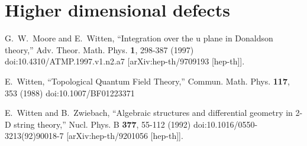 \documentclass[11pt]{amsart}
\def\ep{\varepsilon}
\def\brian#1{{\textcolor{blue!65!red}{BRW: {#1}}}}
\begin{document}
\section{Higher dimensional defects} 


\begin{thebibliography}{KWWY14}

G.~W.~Moore and E.~Witten,
``Integration over the u plane in Donaldson theory,''
Adv. Theor. Math. Phys. \textbf{1}, 298-387 (1997)
doi:10.4310/ATMP.1997.v1.n2.a7
[arXiv:hep-th/9709193 [hep-th]].

E.~Witten,
``Topological Quantum Field Theory,''
Commun. Math. Phys. \textbf{117}, 353 (1988)
doi:10.1007/BF01223371


E.~Witten and B.~Zwiebach,
``Algebraic structures and differential geometry in 2-D string theory,''
Nucl. Phys. B \textbf{377}, 55-112 (1992)
doi:10.1016/0550-3213(92)90018-7
[arXiv:hep-th/9201056 [hep-th]].


\end{thebibliography}
\end{document}
